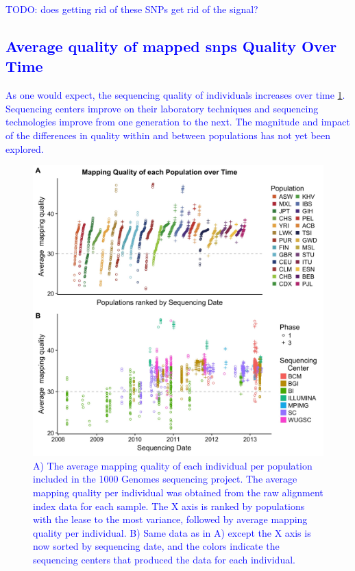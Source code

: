 \documentclass[12pt]{amsart}
\newcommand{\todo}[1]{\textcolor{blue}{TODO: #1}}
\begin{document}
\todo{does getting rid of these SNPs get rid of the signal?  

	\subsection{Average quality of mapped snps Quality Over Time}
As one would expect, the sequencing quality of individuals increases over time \ref{Figure1}. Sequencing centers improve on their laboratory techniques and sequencing technologies improve from one generation to the next. The magnitude and impact of the differences in quality within and between populations has not yet been explored. 

\begin{figure}
\includegraphics[width=\hsize,keepaspectratio]{MapQualOverTime.jpg}

\caption{A) The average mapping quality of each individual per population included in the 1000 Genomes sequencing project. The average mapping quality per individual was obtained from the raw alignment index data for each sample. The X axis is ranked by populations with the lease to the most variance, followed by average mapping quality per individual. B) Same data as in A) except the X axis is now sorted by sequencing date, and the colors indicate the sequencing centers that produced the data for each individual.}
\label{Figure1}
\end{figure}

}
\end{document}

